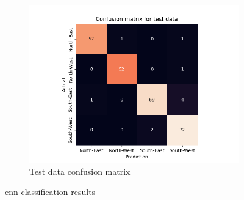 \documentclass[10pt,twocolumn,letterpaper]{article}
\begin{document}
\begin{figure}[h]
\begin{subfigure}{0.33\linewidth}
    \includegraphics[width=\linewidth, trim={7em, 0em, 9em, 5em}, clip]{cnn_cfsn_test}
    \caption{Test data confusion matrix}
    \label{fig:cnn_test}
  \end{subfigure}
  \caption{\acrshort{cnn} classification results}
  \label{fig:cnn_res}
\end{figure}
\end{document}
